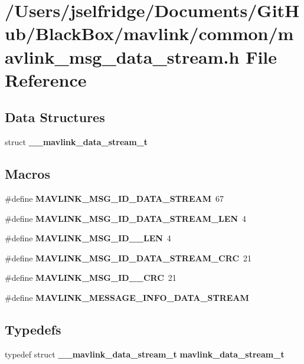 \section{/\+Users/jselfridge/\+Documents/\+Git\+Hub/\+Black\+Box/mavlink/common/mavlink\+\_\+msg\+\_\+data\+\_\+stream.h File Reference}
\label{mavlink__msg__data__stream_8h}
\subsection*{Data Structures}
\begin{DoxyCompactItemize}
\item 
struct \textbf{ \+\_\+\+\_\+mavlink\+\_\+data\+\_\+stream\+\_\+t}
\end{DoxyCompactItemize}
\subsection*{Macros}
\begin{DoxyCompactItemize}
\item 
\#define \textbf{ M\+A\+V\+L\+I\+N\+K\+\_\+\+M\+S\+G\+\_\+\+I\+D\+\_\+\+D\+A\+T\+A\+\_\+\+S\+T\+R\+E\+AM}~67
\item 
\#define \textbf{ M\+A\+V\+L\+I\+N\+K\+\_\+\+M\+S\+G\+\_\+\+I\+D\+\_\+\+D\+A\+T\+A\+\_\+\+S\+T\+R\+E\+A\+M\+\_\+\+L\+EN}~4
\item 
\#define \textbf{ M\+A\+V\+L\+I\+N\+K\+\_\+\+M\+S\+G\+\_\+\+I\+D\+\_\+\_\+\+L\+EN}~4
\item 
\#define \textbf{ M\+A\+V\+L\+I\+N\+K\+\_\+\+M\+S\+G\+\_\+\+I\+D\+\_\+\+D\+A\+T\+A\+\_\+\+S\+T\+R\+E\+A\+M\+\_\+\+C\+RC}~21
\item 
\#define \textbf{ M\+A\+V\+L\+I\+N\+K\+\_\+\+M\+S\+G\+\_\+\+I\+D\+\_\+\_\+\+C\+RC}~21
\item 
\#define \textbf{ M\+A\+V\+L\+I\+N\+K\+\_\+\+M\+E\+S\+S\+A\+G\+E\+\_\+\+I\+N\+F\+O\+\_\+\+D\+A\+T\+A\+\_\+\+S\+T\+R\+E\+AM}
\end{DoxyCompactItemize}
\subsection*{Typedefs}
\begin{DoxyCompactItemize}
\item 
typedef struct \textbf{ \+\_\+\+\_\+mavlink\+\_\+data\+\_\+stream\+\_\+t} \textbf{ mavlink\+\_\+data\+\_\+stream\+\_\+t}
\end{DoxyCompactItemize}


